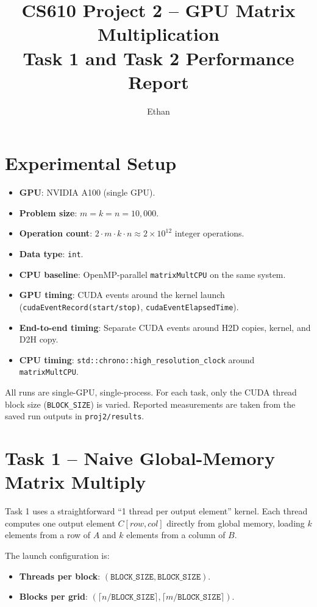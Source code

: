 \documentclass[11pt]{article}
\begin{document}
\title{CS610 Project 2 -- GPU Matrix Multiplication\\Task 1 and Task 2 Performance Report}
\author{Ethan}
\date{}
\maketitle

\section{Experimental Setup}

\begin{itemize}
  \item \textbf{GPU}: NVIDIA A100 (single GPU).
  \item \textbf{Problem size}: \(m = k = n = 10{,}000\).
  \item \textbf{Operation count}: \(2 \cdot m \cdot k \cdot n \approx 2 \times 10^{12}\) integer operations.
  \item \textbf{Data type}: \texttt{int}.
  \item \textbf{CPU baseline}: OpenMP-parallel \texttt{matrixMultCPU} on the same system.
  \item \textbf{GPU timing}: CUDA events around the kernel launch (\texttt{cudaEventRecord(start/stop)}, \texttt{cudaEventElapsedTime}).
  \item \textbf{End-to-end timing}: Separate CUDA events around H2D copies, kernel, and D2H copy.
  \item \textbf{CPU timing}: \texttt{std::chrono::high\_resolution\_clock} around \texttt{matrixMultCPU}.
\end{itemize}

All runs are single-GPU, single-process. For each task, only the CUDA thread block size (\texttt{BLOCK\_SIZE}) is varied. Reported measurements are taken from the saved run outputs in \texttt{proj2/results}.

\section{Task 1 -- Naive Global-Memory Matrix Multiply}

Task 1 uses a straightforward ``1 thread per output element'' kernel. Each thread computes one output element \(C[row, col]\) directly from global memory, loading \(k\) elements from a row of \(A\) and \(k\) elements from a column of \(B\).

The launch configuration is:
\begin{itemize}
  \item \textbf{Threads per block}: \((\texttt{BLOCK\_SIZE}, \texttt{BLOCK\_SIZE})\).
  \item \textbf{Blocks per grid}: \((\lceil n / \texttt{BLOCK\_SIZE} \rceil, \lceil m / \texttt{BLOCK\_SIZE} \rceil)\).
\end{itemize}
\end{document}
